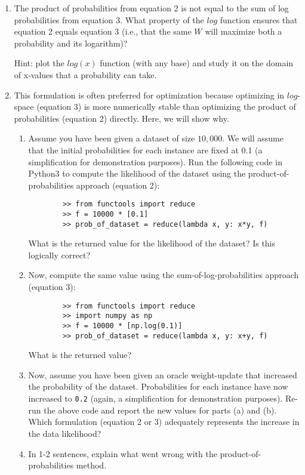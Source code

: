 \documentclass[12pt, letterpaper]{article}
\begin{document}
\begin{enumerate}[label=\alph*.]
    \item The product of probabilities from equation 2 is not equal to the sum of log probabilities from equation 3. What property of the $log$ function ensures that equation 2 equals equation 3 (i.e., that the same $W$ will maximize both a probability and its logarithm)? 
    
    Hint: plot the $log(x)$ function (with any base) and study it on the domain of x-values that a probability can take.

    \item This formulation is often preferred for optimization because optimizing in $log$-space (equation 3) is more numerically stable than optimizing the product of probabilities (equation 2) directly. Here, we will show why.

    \begin{enumerate}
        \item Assume you have been given a dataset of size $10,000$. We will assume that the initial probabilities for each instance are fixed at 0.1 (a simplification for demonstration purposes).
    Run the following code in Python3 to compute the likelihood of the dataset using the product-of-probabilities approach (equation 2):
    
    \begin{verbatim}
        >> from functools import reduce
        >> f = 10000 * [0.1]
        >> prob_of_dataset = reduce(lambda x, y: x*y, f)
    \end{verbatim}
    What is the returned value for the likelihood of the dataset? Is this logically correct?

    \item Now, compute the same value using the sum-of-log-probabilities approach (equation 3):
    
    \begin{verbatim}
        >> from functools import reduce
        >> import numpy as np
        >> f = 10000 * [np.log(0.1)]
        >> prob_of_dataset = reduce(lambda x, y: x+y, f)
    \end{verbatim}
    What is the returned value?
    
    \item Now, assume you have been given an oracle weight-update that increased the probability of the dataset. Probabilities for each instance have now increased to {\tt{0.2}} (again, a simplification for demonstration purposes). Re-run the above code and report the new values for parts (a) and (b). Which formulation (equation 2 or 3) adequately represents the increase in the data likelihood?
    
    \item In 1-2 sentences, explain what went wrong with the product-of-probabilities method.
    
    \end{enumerate}

\end{enumerate}
\end{document}
